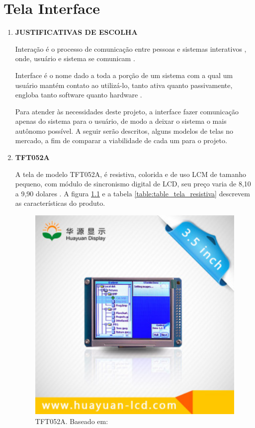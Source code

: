 \chapter[Tela Interface]{Tela Interface}
\begin{enumerate}
\item \textbf{JUSTIFICATIVAS DE ESCOLHA}

Interação é o processo de comunicação entre pessoas e sistemas interativos \cite{prates},
onde, usuário e sistema se comunicam \cite{preece}.

Interface é o nome dado a toda a porção de um sistema com a qual um usuário
mantém contato ao utilizá-lo, tanto ativa quanto passivamente, engloba tanto
software quanto hardware \cite{preece}.

Para atender às necessidades deste projeto, a interface fazer comunicação
 apenas do sistema para o usuário, de modo a deixar o sistema o mais autônomo
  possível. A seguir serão descritos, alguns modelos de telas no mercado, a
   fim de comparar a viabilidade de cada um para o projeto.

\item \textbf{TFT052A}

A tela de modelo TFT052A, é resistiva, colorida e de uso LCM de tamanho pequeno,
com módulo de sincronismo digital de LCD, seu preço varia de 8,10 a 9,90 dolares \cite{tela_resistiva}.
A figura \ref{fig:imagem_interface} e a tabela \ref{table:table_tela_resistiva} descrevem as
características do produto.

\begin{figure}[h]
  \centering
  \includegraphics[width=400px, scale=1]{figuras/imagem_interface}
  \caption{TFT052A. Baseado em: \cite{tela_resistiva}}
\label{fig:imagem_interface}
\end{figure}


\end{enumerate}
